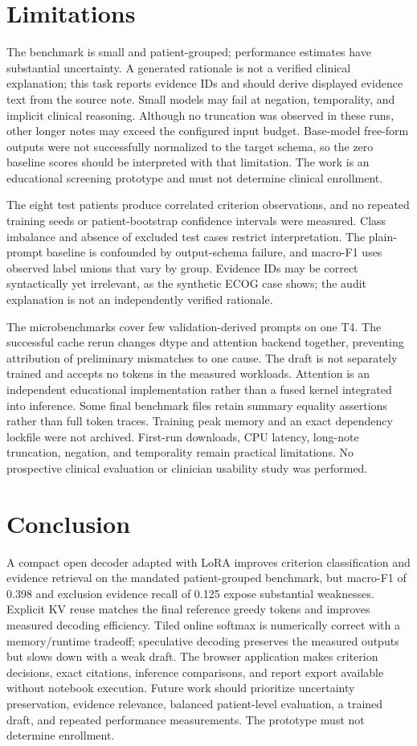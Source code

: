 \documentclass[conference]{IEEEtran}
\begin{document}
\section{Limitations}

The benchmark is small and patient-grouped; performance estimates have substantial uncertainty. A generated rationale is not a verified clinical explanation; this task reports evidence IDs and should derive displayed evidence text from the source note. Small models may fail at negation, temporality, and implicit clinical reasoning. Although no truncation was observed in these runs, other longer notes may exceed the configured input budget. Base-model free-form outputs were not successfully normalized to the target schema, so the zero baseline scores should be interpreted with that limitation. The work is an educational screening prototype and must not determine clinical enrollment.

The eight test patients produce correlated criterion observations, and no repeated training seeds or patient-bootstrap confidence intervals were measured. Class imbalance and absence of excluded test cases restrict interpretation. The plain-prompt baseline is confounded by output-schema failure, and macro-F1 uses observed label unions that vary by group. Evidence IDs may be correct syntactically yet irrelevant, as the synthetic ECOG case shows; the audit explanation is not an independently verified rationale.

The microbenchmarks cover few validation-derived prompts on one T4. The successful cache rerun changes dtype and attention backend together, preventing attribution of preliminary mismatches to one cause. The draft is not separately trained and accepts no tokens in the measured workloads. Attention is an independent educational implementation rather than a fused kernel integrated into inference. Some final benchmark files retain summary equality assertions rather than full token traces. Training peak memory and an exact dependency lockfile were not archived. First-run downloads, CPU latency, long-note truncation, negation, and temporality remain practical limitations. No prospective clinical evaluation or clinician usability study was performed.
\section{Conclusion}

A compact open decoder adapted with LoRA improves criterion classification and evidence retrieval on the mandated patient-grouped benchmark, but macro-F1 of 0.398 and exclusion evidence recall of 0.125 expose substantial weaknesses. Explicit KV reuse matches the final reference greedy tokens and improves measured decoding efficiency. Tiled online softmax is numerically correct with a memory/runtime tradeoff; speculative decoding preserves the measured outputs but slows down with a weak draft. The browser application makes criterion decisions, exact citations, inference comparisons, and report export available without notebook execution. Future work should prioritize uncertainty preservation, evidence relevance, balanced patient-level evaluation, a trained draft, and repeated performance measurements. The prototype must not determine enrollment.
\end{document}
